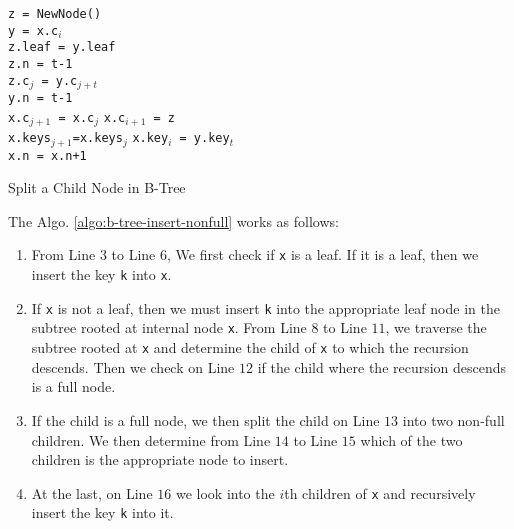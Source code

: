 \begin{algorithm}[H]
\SetAlgoLined
{}
\texttt{z = NewNode()} \\
\texttt{y = x.c$_i$}  \\
\texttt{z.leaf = y.leaf} \\
\texttt{z.n = t-1}\\
 {
	 {
		\texttt{z.c$_j$ = y.c$_{j+t}$} \\
	}
}
\texttt{y.n = t-1}\\
 {
	\texttt{x.c$_{j+1}$ = x.c$_j$}
}
\texttt{x.c$_{i+1}$ = z} \\
 {
	\texttt{x.keys$_{j+1}$=x.keys$_j$}
}
\texttt{x.key$_i$ = y.key$_t$}\\
\texttt{x.n = x.n+1}
\caption{Split a Child Node in B-Tree}
\label{algo:b-tree-split-child}	
\end{algorithm}

The Algo. \ref{algo:b-tree-insert-nonfull} works as follows:

\begin{enumerate}
	\item From Line $3$ to Line $6$, We first check if \texttt{x} is a leaf. If it is a leaf, then we insert the key \texttt{k} into \texttt{x}.
	\item If \texttt{x} is not a leaf, then we must insert \texttt{k} into the appropriate leaf node in the subtree rooted at internal node \texttt{x}. From Line $8$ to Line $11$, we traverse the subtree rooted at \texttt{x} and determine the child of \texttt{x} to which the recursion descends. Then we check on Line $12$ if the child where the recursion descends is a full node.
	\item If the child is a full node, we then split the child on Line $13$ into two non-full children. We then determine from Line $14$ to Line $15$ which of the two children is the appropriate node to insert.
	\item At the last, on Line $16$ we look into the $i$th children of \texttt{x} and recursively insert the key \texttt{k} into it.
\end{enumerate}

